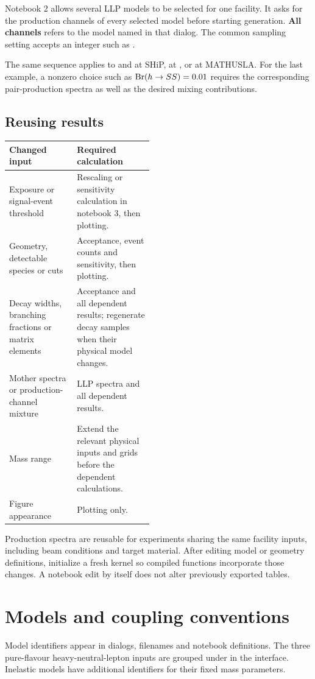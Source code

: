 Notebook 2 allows several LLP models to be selected for one facility. It asks for the production channels of every selected model before starting generation. \textbf{All channels} refers to the model named in that dialog. The common sampling setting accepts an integer such as .

The same sequence applies to  and  at SHiP,  at , or  at MATHUSLA. For the last example, a nonzero choice such as $\operatorname{Br}(h\to SS)=0.01$ requires the corresponding pair-production spectra as well as the desired mixing contributions.

\subsection{Reusing results}
\begin{tabularx}{\linewidth}{@{}P{0.47\linewidth}Y@{}}
\toprule
Changed input & Required calculation \\
\midrule
Exposure or signal-event threshold & Rescaling or sensitivity calculation in notebook 3, then plotting. \\
Geometry, detectable species or cuts & Acceptance, event counts and sensitivity, then plotting. \\
Decay widths, branching fractions or matrix elements & Acceptance and all dependent results; regenerate decay samples when their physical model changes. \\
Mother spectra or production-channel mixture & LLP spectra and all dependent results. \\
Mass range & Extend the relevant physical inputs and grids before the dependent calculations. \\
Figure appearance & Plotting only. \\
\bottomrule
\end{tabularx}

Production spectra are reusable for experiments sharing the same facility inputs, including beam conditions and target material. After editing model or geometry definitions, initialize a fresh kernel so compiled functions incorporate those changes. A notebook edit by itself does not alter previously exported tables.

\section{Models and coupling conventions}\label{sec:models}
Model identifiers appear in dialogs, filenames and notebook definitions. The three pure-flavour heavy-neutral-lepton inputs are grouped under  in the interface. Inelastic models have additional identifiers for their fixed mass parameters.

